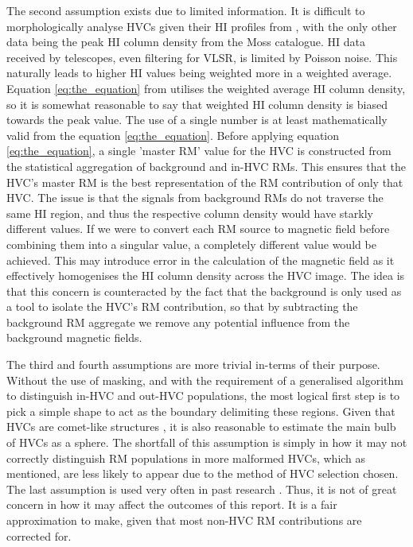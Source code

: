 The second assumption exists due to limited information. It is difficult to morphologically analyse HVCs given their HI profiles from \cite{ID6}, with the only other data being the peak HI column density from the Moss catalogue. HI data received by telescopes, even filtering for VLSR, is limited by Poisson noise. This naturally leads to higher HI values being weighted more in a weighted average. Equation \ref{eq:the_equation} from \cite{ID27} utilises the weighted average HI column density, so it is somewhat reasonable to say that weighted HI column density is biased towards the peak value. The use of a single number is at least mathematically valid from the equation \ref{eq:the_equation}. Before applying equation \ref{eq:the_equation}, a single 'master RM' value for the HVC is constructed from the statistical aggregation of background and in-HVC RMs. This ensures that the HVC's master RM is the best representation of the RM contribution of only that HVC. The issue is that the signals from background RMs do not traverse the same HI region, and thus the respective column density would have starkly different values. If we were to convert each RM source to magnetic field before combining them into a singular value, a completely different value would be achieved. This may introduce error in the calculation of the magnetic field as it effectively homogenises the HI column density across the HVC image. The idea is that this concern is counteracted by the fact that the background is only used as a tool to isolate the HVC's RM contribution, so that by subtracting the background RM aggregate we remove any potential influence from the background magnetic fields. 


The third and fourth assumptions are more trivial in-terms of their purpose. Without the use of masking, and with the requirement of a generalised algorithm to distinguish in-HVC and out-HVC populations, the most logical first step is to pick a simple shape to act as the boundary delimiting these regions. Given that HVCs are comet-like structures \citep{ID13}, it is also reasonable to estimate the main bulb of HVCs as a sphere. The shortfall of this assumption is simply in how it may not correctly distinguish RM populations in more malformed HVCs, which as mentioned, are less likely to appear due to the method of HVC selection chosen. The last assumption is used very often in past research \citep{ID27,ID3, ID26, ID5}. Thus, it is not of great concern in how it may affect the outcomes of this report. It is a fair approximation to make, given that most non-HVC RM contributions are corrected for.


